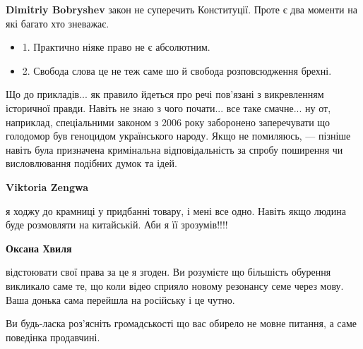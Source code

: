 \begin{itemize}
\begin{itemize}
\textbf{Dimitriy Bobryshev} закон не суперечить Конституції. Проте є два моменти на які багато хто зневажає.

\begin{itemize}
  \item 1. Практично ніяке право не є абсолютним.
  \item 2. Свобода слова це не теж саме шо й свобода розповсюдження брехні.
\end{itemize}

Що до прикладів... як правило йдеться про речі пов’язані з викревленням
історичної правди. Навіть не знаю з чого почати... все таке смачне... ну от,
наприклад, спеціальними законом з 2006 року заборонено заперечувати що
голодомор був геноцидом українського народу. Якщо не помиляюсь, — пізніше
навіть була призначена кримінальна відповідальність за спробу поширення чи
висловлювання подібних думок та ідей.


 
\textbf{Viktoria Zengwa} 

я ходжу до крамниці у придбанні товару, і мені все одно. Навіть якщо людина
буде розмовляти на китайській. Аби я її зрозумів!!!!

 
\textbf{Оксана Хвиля} 

відстоювати свої права за це я згоден. Ви розумієте що більшість обурення
викликало саме те, що коли відео сприяло новому резонансу семе через мову. Ваша
донька сама перейшла на російську і це чутно.

Ви будь-ласка роз'ясніть громадськості що вас обирело не мовне питання, а саме
поведінка продавчині.

\end{itemize}

 

\end{itemize}
